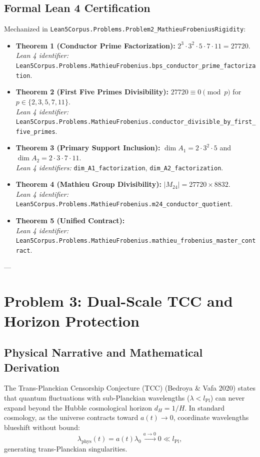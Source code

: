 \documentclass[11pt,a4paper]{article}
\begin{document}
\subsection{Formal Lean 4 Certification}
Mechanized in \texttt{Lean5Corpus.Problems.Problem2\_MathieuFrobeniusRigidity}:
\begin{itemize}
    \item \textbf{Theorem 1 (Conductor Prime Factorization):} $2^3 \cdot 3^2 \cdot 5 \cdot 7 \cdot 11 = 27720$. \\
    \textit{Lean 4 identifier:} \texttt{Lean5Corpus.Problems.MathieuFrobenius.bps\_conductor\_prime\_factorization}.
    \item \textbf{Theorem 2 (First Five Primes Divisibility):} $27720 \equiv 0 \pmod p$ for $p \in \{2, 3, 5, 7, 11\}$. \\
    \textit{Lean 4 identifier:} \texttt{Lean5Corpus.Problems.MathieuFrobenius.conductor\_divisible\_by\_first\_five\_primes}.
    \item \textbf{Theorem 3 (Primary Support Inclusion):} $\dim A_1 = 2 \cdot 3^2 \cdot 5$ and $\dim A_2 = 2 \cdot 3 \cdot 7 \cdot 11$. \\
    \textit{Lean 4 identifiers:} \texttt{dim\_A1\_factorization}, \texttt{dim\_A2\_factorization}.
    \item \textbf{Theorem 4 (Mathieu Group Divisibility):} $|M_{24}| = 27720 \times 8832$. \\
    \textit{Lean 4 identifier:} \texttt{Lean5Corpus.Problems.MathieuFrobenius.m24\_conductor\_quotient}.
    \item \textbf{Theorem 5 (Unified Contract):} \\
    \textit{Lean 4 identifier:} \texttt{Lean5Corpus.Problems.MathieuFrobenius.mathieu\_frobenius\_master\_contract}.
\end{itemize}

---

\section{Problem 3: Dual-Scale TCC and Horizon Protection}

\subsection{Physical Narrative and Mathematical Derivation}
The Trans-Planckian Censorship Conjecture (TCC) (Bedroya \& Vafa 2020) states that quantum fluctuations with sub-Planckian wavelengths ($\lambda < l_{\mathrm{Pl}}$) can never expand beyond the Hubble cosmological horizon $d_H = 1/H$. In standard cosmology, as the universe contracts toward $a(t) \to 0$, coordinate wavelengths blueshift without bound:
\begin{equation}
    \lambda_{\mathrm{phys}}(t) = a(t) \lambda_0 \xrightarrow{a \to 0} 0 \ll l_{\mathrm{Pl}},
\end{equation}
generating trans-Planckian singularities.
\end{document}
